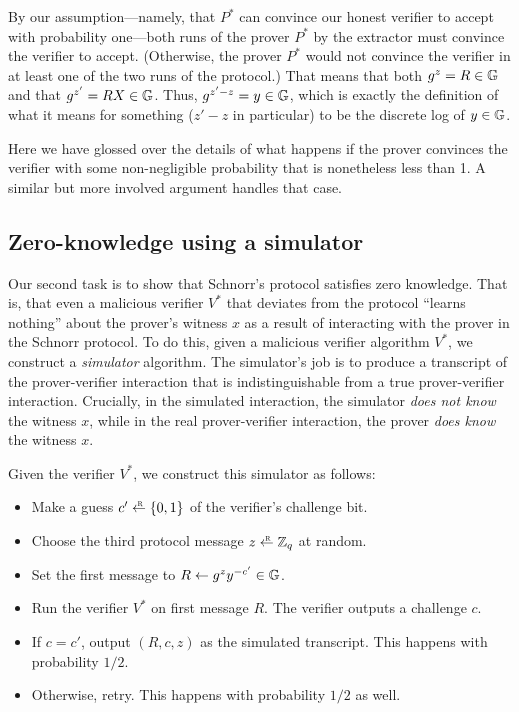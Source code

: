 By our assumption---namely, that $P^*$ can convince our honest verifier
to accept with probability one---both
runs of the prover $P^*$ by the extractor must convince the verifier to accept. (Otherwise,
the prover $P^*$ would not convince the verifier in at least one of the two runs of the protocol.)
That means that both $g^z=R \in \mathbb{G}$ and that $g^{z'}=RX \in \mathbb{G}$.  Thus, $g^{z'-z}=y \in \mathbb{G}$,
which is exactly the definition of what it means for something ($z'-z$
in particular) to be the discrete log of $y \in \mathbb{G}$.

Here we have glossed over the details of what happens if the prover
convinces the verifier with some non-negligible probability that is
nonetheless less than 1.
A similar but more involved argument handles that case.

\subsection{Zero-knowledge using a simulator}

Our second task is to show that Schnorr's protocol satisfies zero knowledge.
That is, that even a malicious verifier $V^*$ that deviates from
the protocol ``learns nothing'' about the prover's witness
$x$ as a result of interacting with the prover in the Schnorr protocol.
To do this, given a malicious verifier algorithm $V^*$, we construct a \emph{simulator} algorithm.
The simulator's job
is to produce a transcript of the prover-verifier interaction that is
indistinguishable from a true prover-verifier interaction.
Crucially, in the simulated interaction, the simulator \emph{does not know} the witness $x$,
while in the real prover-verifier interaction, the prover \emph{does know} the witness $x$.

Given the verifier $V^*$, 
we construct this simulator as follows:

\begin{itemize}

  \item Make a guess $c' \getsr \{0,1\}$ of the verifier's challenge bit.

  \item Choose the third protocol message $z \getsr \Z_q$ at random.

  \item Set the first message to $R \gets g^z y^{-c'} \in \mathbb{G}$.

  \item Run the verifier $V^*$ on first message $R$.
        The verifier outputs a challenge $c$.
  \item If $c=c'$, output $(R, c, z)$ as the simulated transcript.
        This happens with probability $1/2$.

\item Otherwise, retry.  This happens with probability $1/2$ as well.

\end{itemize}

